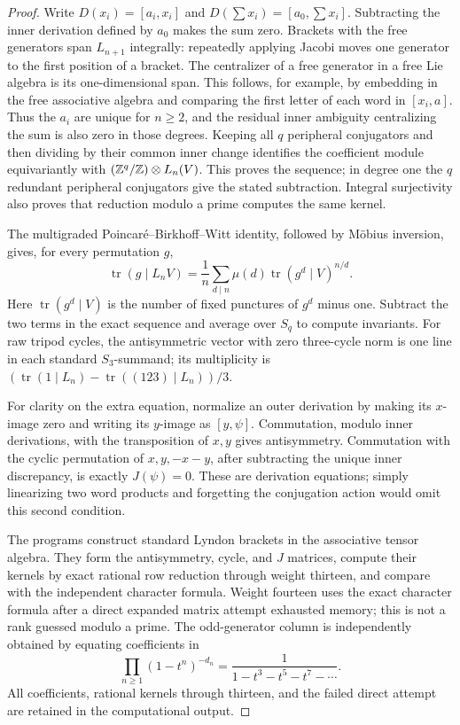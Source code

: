 \begin{proof}
Write $D(x_i)=[a_i,x_i]$ and
$D(\sum x_i)=[a_0,\sum x_i]$. Subtracting the inner derivation
defined by $a_0$ makes the sum zero. Brackets with the free
generators span $L_{n+1}$ integrally: repeatedly applying Jacobi
moves one generator to the first position of a bracket.
The centralizer of a free generator in a free Lie algebra is its
one-dimensional span. This follows, for example, by embedding in
the free associative algebra and comparing the first letter of
each word in $[x_i,a]$. Thus the $a_i$ are unique for $n\ge2$,
and the residual inner ambiguity centralizing the sum is also
zero in those degrees. Keeping all $q$ peripheral conjugators
and then dividing by their common inner change identifies the
coefficient module equivariantly with
$(\mathbb Z^q/\mathbb Z)\otimes L_n(V)$. This proves the sequence; in degree
one the $q$ redundant peripheral conjugators give the stated
subtraction. Integral surjectivity also proves that reduction
modulo a prime computes the same kernel.

The multigraded Poincaré--Birkhoff--Witt identity, followed by
Möbius inversion, gives, for every permutation $g$,
\[
 \operatorname{tr}(g\mid L_nV)
 =\frac1n\sum_{d\mid n}\mu(d)
       \operatorname{tr}(g^d\mid V)^{n/d}.
\]
Here $\operatorname{tr}(g^d\mid V)$ is the number of fixed
punctures of $g^d$ minus one. Subtract the two terms in the
exact sequence and average over $S_q$ to compute invariants.
For raw tripod cycles, the antisymmetric vector with zero
three-cycle norm is one line in each standard $S_3$-summand;
its multiplicity is
$(\operatorname{tr}(1\mid L_n)-\operatorname{tr}((123)\mid L_n))/3$.

For clarity on the extra equation, normalize an outer
derivation by making its $x$-image zero and writing its
$y$-image as $[y,\psi]$. Commutation, modulo inner
derivations, with the transposition of $x,y$ gives
antisymmetry. Commutation with the cyclic permutation of
$x,y,-x-y$, after subtracting the unique inner discrepancy,
is exactly $J(\psi)=0$. These are derivation equations; simply
linearizing two word products and forgetting the conjugation
action would omit this second condition.

The programs construct standard Lyndon brackets in the
associative tensor algebra. They form the antisymmetry,
cycle, and $J$ matrices, compute their kernels by exact
rational row reduction through weight thirteen, and compare
with the independent character formula. Weight fourteen uses
the exact character formula after a direct expanded matrix
attempt exhausted memory; this is not a rank guessed modulo
a prime. The odd-generator column is independently obtained
by equating coefficients in
\[
 \prod_{n\ge1}(1-t^n)^{-d_n}
       =\frac1{1-t^3-t^5-t^7-\cdots}.
\]
All coefficients, rational kernels through thirteen, and the
failed direct attempt are retained in the computational output.
\end{proof}

